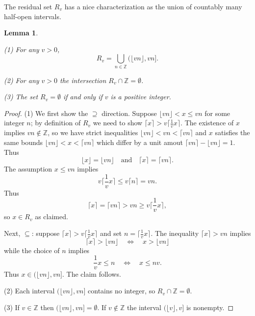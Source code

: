 \documentclass[12pt,letterpaper, reqno]{amsart}
\newtheorem{lem}[thm]{Lemma}
\theoremstyle{definition}
\theoremstyle{remark}
\newcommand{\ZZ}{\ensuremath{\mathbb{Z}}}
\newcommand{\R}{{R}}
\newcommand{\floor}[1]{\lfloor{#1}\rfloor}
\newcommand{\ceil}[1]{\lceil{#1}\rceil}
\begin{document}
The residual set $R_v$ has a nice characterization as the  union of countably many half-open intervals.
\begin{lem}\label{lem:41}

(1) For any $v>0$, 
\[ \R_v = \bigcup_{n\in\ZZ} \big( \floor{vn}, vn \big] . \]

(2)  For any $v >0$ the intersection $\R_v \cap \ZZ = \emptyset$. 

(3) The set $\R_v = \emptyset$  if and only if $v$ is a positive integer.
\end{lem}
\begin{proof}
(1) We first show  the $\supseteq$ direction. Suppose $\floor{vn}<x\leq vn$ for some integer $n$; 
by definition of $R_v$ we need to show $\ceil{x}>v\ceil{\frac1v x}$. 
The existence of $x$ implies $vn\not\in\ZZ$, so we have strict inequalities $\floor{vn}<vn<\ceil{vn}$ 
and $x$ satisfies the same bounds $\floor{vn}<x<\ceil{vn}$ which differ by a unit amout $\ceil{vn}-\floor{vn}=1$. 
Thus
\[ \floor{x}=\floor{vn} \quad\text{and}\quad \ceil{x}=\ceil{vn}.\]
The assumption $x\leq vn$ implies
\[ v\ceil{\textstyle\frac{1}{v }x} \leq v\ceil{n} = vn.\]
Thus 
\[ 
\ceil{x}= \ceil{vn}> vn  \geq v\ceil{\textstyle\frac1v x},
\]
so $x\in \R_v$ as claimed. 

Next, $\subseteq$: suppose
$\ceil{x}> v\ceil{\frac1v x}$ and set $n = \ceil{\frac1v x}$. 
The inequality $\ceil{x}>vn$ implies
\[ \ceil{x}>\floor{vn} \quad\Leftrightarrow\quad x>\floor{vn}\]
while the choice of $n$ implies
\[ \frac1v x\leq n \quad\Leftrightarrow\quad x\leq nv.\]
Thus $x\in (\floor{vn},vn]$.
The claim follows.

(2) Each interval $(\floor{vn}, vn]$ contains no integer, so  $\R_v \cap \ZZ = \emptyset$.

(3) If $v \in \ZZ$ then $(\floor{vn}, vn]= \emptyset$.
If $v \notin \ZZ$ the interval $(\floor{v},v]$ is nonempty.
\end{proof}
\end{document}
